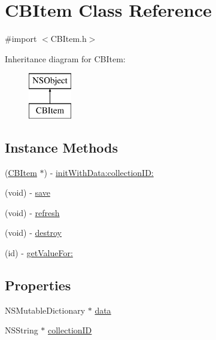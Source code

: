 \hypertarget{interface_c_b_item}{\section{C\-B\-Item Class Reference}
\label{interface_c_b_item}
}


{\ttfamily \#import $<$C\-B\-Item.\-h$>$}

Inheritance diagram for C\-B\-Item\-:\begin{figure}[H]
\begin{center}
\leavevmode
\includegraphics[height=2.000000cm]{interface_c_b_item}
\end{center}
\end{figure}
\subsection*{Instance Methods}
\begin{DoxyCompactItemize}
\item 
(\hyperlink{interface_c_b_item}{C\-B\-Item} $\ast$) -\/ \hyperlink{interface_c_b_item_a6bddee842c3dbee197342896c8107fee}{init\-With\-Data\-:collection\-I\-D\-:}
\item 
(void) -\/ \hyperlink{interface_c_b_item_ad09f007f812f568c3da0c4fd0f92a231}{save}
\item 
(void) -\/ \hyperlink{interface_c_b_item_a613055bfa99fa8059f521976ec9ac0eb}{refresh}
\item 
(void) -\/ \hyperlink{interface_c_b_item_ae0e3edabb3f5ecf9edf318b66c96792e}{destroy}
\item 
(id) -\/ \hyperlink{interface_c_b_item_ac9c81960a9a34c2bc0258e733f88f6b5}{get\-Value\-For\-:}
\end{DoxyCompactItemize}
\subsection*{Properties}
\begin{DoxyCompactItemize}
\item 
N\-S\-Mutable\-Dictionary $\ast$ \hyperlink{interface_c_b_item_ab9ea1d2d19a9c76e23029bab43b4ba30}{data}
\item 
N\-S\-String $\ast$ \hyperlink{interface_c_b_item_a8d47dba1bcfeb0754b65d312a48a939a}{collection\-I\-D}
\end{DoxyCompactItemize}


